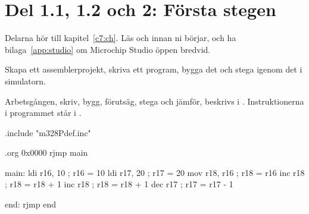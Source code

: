 
\section{Del 1.1, 1.2 och 2: Första stegen}
\label{lab3:sec:a}
Delarna hör till kapitel~\ref{c7:ch}. Läs  och  innan ni börjar,
och ha bilaga~\ref{app:studio} om Microchip Studio öppen bredvid.

%
\label{lab3:d1-1}
Skapa ett assemblerprojekt, skriva ett program, bygga det och stega igenom det i simulatorn.

Arbetsgången, skriv, bygg, förutsäg, stega och jämför, beskrivs i . Instruktionerna
i programmet står i .

\begin{asmcode}
.include "m328Pdef.inc"

.org 0x0000
    rjmp main

main:
    ldi r16, 10                     ; r16 = 10
    ldi r17, 20                     ; r17 = 20
    mov r18, r16                    ; r18 = r16
    inc r18                         ; r18 = r18 + 1
    inc r18                         ; r18 = r18 + 1
    dec r17                         ; r17 = r17 - 1

end:
    rjmp end
\end{asmcode}

